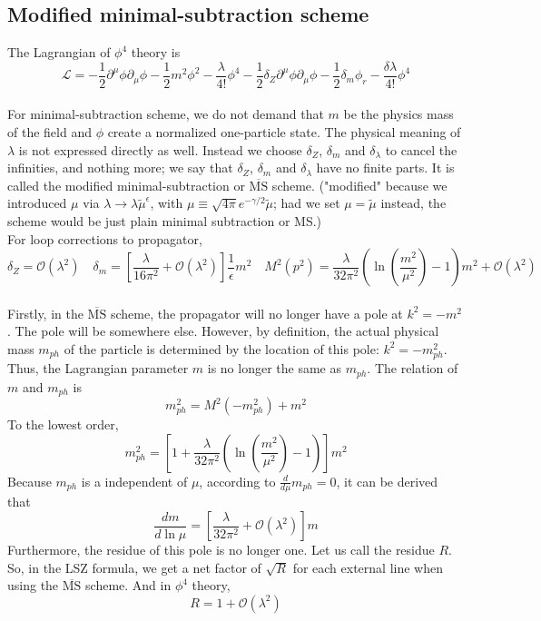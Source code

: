 \documentclass[cyan]{elegantnote}
\begin{document}
\subsection{Modified minimal-subtraction scheme}
The Lagrangian of $\phi^4$ theory is
\[\mathcal{L} = -\frac{1}{2} \partial^{\mu} \phi \partial_{\mu} \phi -\frac{1}{2}m^2 \phi^2 - \frac{\lambda}{4!}\phi^4 -\frac{1}{2} \delta_Z \partial^{\mu} \phi \partial_{\mu} \phi -\frac{1}{2}\delta_m \phi_r - \frac{\delta \lambda}{4!}\phi^4\]
\\
For minimal-subtraction scheme, we do not demand that $m$ be the physics mass of the field and $\phi$  create a normalized one-particle state. The physical meaning of $\lambda$ is not expressed directly as well. Instead we choose $\delta_Z$, $\delta_m$ and $\delta_{\lambda}$ to cancel the infinities, and nothing more;
we say that $\delta_Z$, $\delta_m$ and $\delta_{\lambda}$ have no finite parts. It is called the modified minimal-subtraction or $\mathrm{\overline{MS}}$ scheme. ("modified" because we introduced $\mu$ via  $\lambda \to \lambda \tilde{\mu}^{\epsilon}$, with $\mu \equiv  \sqrt{4\pi} e^{-\gamma/2} \tilde{\mu}$; had we set $\mu = \tilde{\mu}$ instead, the scheme would be just plain minimal subtraction or MS.)
\\
For loop corrections to propagator,
\[\delta_Z=\mathcal{O}(\lambda^2) \quad \delta_m = \left[ \frac{\lambda}{16\pi^2} + \mathcal{O}(\lambda^2) \right]\frac{1}{\epsilon}m^2 \quad M^2(p^2) = \frac{\lambda}{32\pi^2}( \ln(\frac{m^2}{\mu^2})-1)m^2 + \mathcal{O}(\lambda^2)\]
\\
Firstly, in the $\mathrm{\overline{MS}}$ scheme, the propagator will no longer have a pole at $k^2=-m^2$. The pole will be somewhere else. However, by definition, the actual physical mass $m_{ph}$ of the particle is determined by the location of this pole: $k^2 = -m_{ph}^2$. Thus, the Lagrangian parameter $m$ is no longer the same as $m_{ph}$. The relation of $m$ and $m_{ph}$ is 
\[m_{ph}^2 = M^2(-m_{ph}^2) + m^2\]
To the lowest order, 
\[m_{ph}^2 = \left[1+\frac{\lambda}{32\pi^2}( \ln(\frac{m^2}{\mu^2})-1)\right] m^2\]
Because $m_{ph}$ is a independent of $\mu$, according to $\frac{d}{d\mu} m_{ph} = 0$, it can be derived that
\[\frac{dm}{d\ln \mu} = \left[\frac{\lambda}{32\pi^2}+\mathcal{O}(\lambda^2)\right] m\]
Furthermore, the residue of this pole is no longer one. Let us call the residue $R$. So, in the LSZ formula, we get a net factor of $\sqrt{R}$ for each external line when using the $\mathrm{\overline{MS}}$ scheme. And in $\phi^4$ theory,
\[R = 1 + \mathcal{O}(\lambda^2)\]
\end{document}
